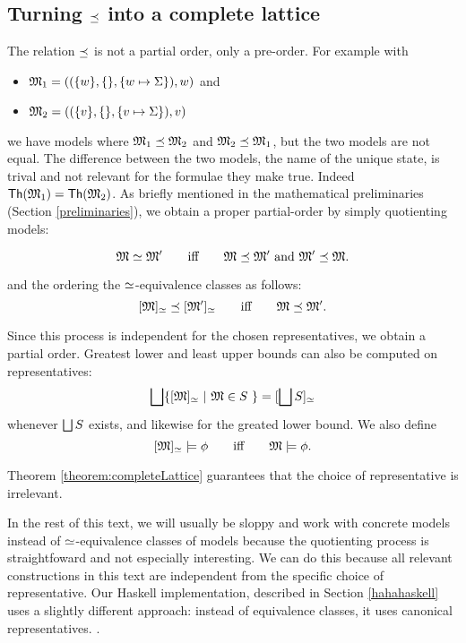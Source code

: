\subsection{Turning $\preceq$ into a complete lattice}

\NI The relation $\preceq$ is not a partial order, only a
pre-order. For example with
\begin{itemize}

\item $\frak{M}_1 = ( (\{w\}, \{\}, \{w \mapsto \Sigma\}), w)$ and
\item $\frak{M}_2 = ( (\{v\}, \{\}, \{v \mapsto \Sigma\}), v)$ 

\end{itemize}

\NI we have models where $\frak{M}_1 \preceq \frak{M}_2$ and $\frak{M}_2
\preceq \frak{M}_1$, but the two models are not equal. The difference
between the two models, the name of the unique state, is trival and
not relevant for the formulae they make true. Indeed $\mathsf{Th}(\frak{M}_1)
= \mathsf{Th}(\frak{M}_2)$.  As briefly mentioned in the mathematical
preliminaries (Section \ref{preliminaries}), we obtain a proper
partial-order by simply quotienting models:

\[
   \frak{M} \simeq \frak{M}'
      \qquad\text{iff}\qquad
   \frak{M} \preceq \frak{M}' \ \text{and}\ \frak{M}' \preceq \frak{M}.
\]

\NI and the ordering the $\simeq$-equivalence classes as follows:
\[
    [\frak{M}]_{\simeq} \preceq [\frak{M}']_{\simeq}
      \qquad\text{iff}\qquad
    \frak{M} \preceq \frak{M}'.
\]

\NI Since this process is independent for the chosen representatives,
we obtain a partial order. Greatest lower and least upper bounds can also
be computed on representatives:
\[
   \bigsqcup \{[\frak{M}]_{\simeq} \ |\ \frak{M} \in S\ \} = [\bigsqcup S]_{\simeq}
\]
whenever $\bigsqcup S$ exists, and likewise for the greated lower bound.
We also define 
\[
   [\frak{M}]_{\simeq} \models \phi 
      \qquad\text{iff}\qquad
   \frak{M} \models \phi.
\]

\NI Theorem \ref{theorem:completeLattice} guarantees that the choice
of representative is irrelevant.

In the rest of this text, we will usually be sloppy and work with
concrete models instead of $\simeq$-equivalence classes of models
because the quotienting process is straightfoward and not especially
interesting. We can do this because all relevant constructions in this
text are independent from the specific choice of representative.  Our
Haskell implementation, described in Section \ref{hahahaskell} uses a
slightly different approach: instead of equivalence classes, it uses
canonical representatives.  .

